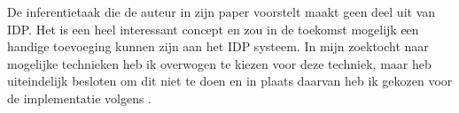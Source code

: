 De inferentietaak die de auteur in zijn paper voorstelt maakt geen deel uit van IDP. Het is een heel interessant concept en zou in de toekomst mogelijk een handige toevoeging kunnen zijn aan het IDP systeem. In mijn zoektocht naar mogelijke technieken heb ik overwogen te kiezen voor deze techniek, maar heb uiteindelijk besloten om dit niet te doen en in plaats daarvan heb ik gekozen voor de implementatie volgens \citep{amilhastre2002consistency}.
